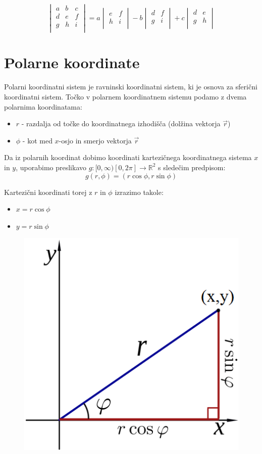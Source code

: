 \documentclass[12pt, a4paper]{article}
\begin{document}
\[
\begin{vmatrix}
 a&b&c\\
 d&e&f\\
 g&h&i\\
\end{vmatrix}
=a\begin{vmatrix}
e&f\\
h&i\\
\end{vmatrix}-b\begin{vmatrix}
d&f\\
g&i\\
\end{vmatrix}+c\begin{vmatrix}
d&e\\
g&h\\
\end{vmatrix}
\]




\section{Polarne koordinate}
Polarni koordinatni sistem je ravninski koordinatni sistem, ki je osnova za sferični koordinatni sistem. Točko v polarnem koordinatnem sistemu podamo z dvema polarnima koordinatama:
\begin{itemize}
\item $r$ - razdalja od točke do koordinatnega izhodišča (dolžina vektorja $\vec{r}$)
\item $\phi$ - kot med $x$-osjo in smerjo vektorja $\vec{r}$
\end{itemize}

Da iz polarnih koordinat dobimo koordinati kartezičnega koordinatnega sistema $x$ in $y$, uporabimo preslikavo $g:[ 0,\infty)    [0,2\pi]  \rightarrow  \mathbb{R}^2$ s sledečim predpisom:
$$g(r,\phi) = (r \cos \phi, r \sin \phi)$$

Kartezični koordinati torej z $r$ in $\phi$ izrazimo takole:
\begin{itemize}
\item $x=r \cos \phi$
\item $y=r \sin \phi$
\end{itemize}

\begin{figure}[h!]
\centering
\includegraphics[width=.4\textwidth]{polarne_koordinate.png}
\end{figure}
\end{document}
